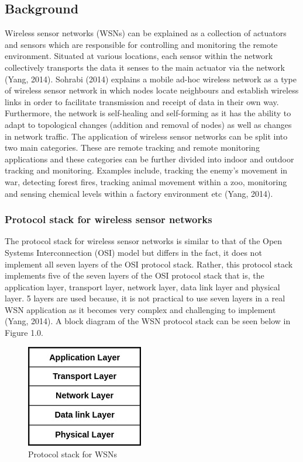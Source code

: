 \documentclass[a4paper]{article}
\begin{document}
\subsection{Background}	
Wireless sensor networks (WSNs) can be explained as a collection of actuators and sensors which are responsible for controlling and monitoring the remote environment. Situated at various locations, each sensor within the network collectively transports the  data it senses to the main actuator via the network (Yang, 2014). Sohrabi (2014) explains a mobile ad-hoc wireless network as a type of wireless sensor network in which nodes locate neighbours and establish wireless links in order to facilitate transmission and receipt of data in their own way. Furthermore, the network is self-healing and self-forming as it has the ability to adapt to topological changes (addition and removal of nodes) as well as changes in network traffic. The application of wireless sensor networks can be split into two main categories. These are remote tracking and remote monitoring applications and these categories can be further divided into indoor and outdoor tracking and monitoring. Examples include, tracking the enemy's movement in war, detecting forest fires, tracking animal movement within a zoo, monitoring and sensing chemical levels within a factory environment etc (Yang, 2014). 


\parskip 0.2in 

\subsubsection{Protocol stack for wireless sensor networks}
The protocol stack for wireless sensor networks is similar to that of the Open Systems Interconnection (OSI) model but differs in the fact, it does not implement all seven layers of the OSI protocol stack. Rather, this protocol stack implements five of the seven layers of the OSI protocol stack that is, the application layer, transport layer, network layer, data link layer and physical layer. 5 layers are used because, it is not practical to use seven layers in a real WSN application as it becomes very complex and challenging to implement (Yang, 2014). A block diagram of the WSN protocol stack can be seen below in Figure 1.0. 

\parskip 0.2in 

\begin{figure}[!htb] 
  \centering
  \includegraphics[scale=0.6]{protocolstack}
  \begin{center}
  	\caption{Protocol stack for WSNs}
  \end{center} 
  \label{fig:protocolstack} 
\end{figure}
\end{document}
